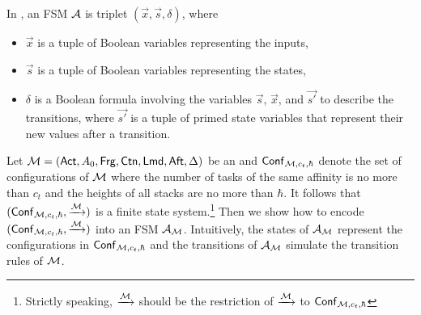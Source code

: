 In \nuxmv, an FSM  ${\mathcal{A} }$ is triplet
$(\vec{x}, \vec{s}, \delta)$, where 
\begin{itemize}
\item $\vec{x}$ is a tuple of Boolean variables representing the inputs, 
\item $\vec{s}$ is a tuple of Boolean variables representing the states,  
\item $\delta$ is a Boolean formula involving the variables $\vec{s}$, $\vec{x}$, and $\vec{s'}$ to describe the transitions, where $\vec{s'}$ is a tuple of primed state variables that represent their new values after a transition.
\end{itemize}
%


Let ${\mathcal{M} } = ({\sf Act}, A_0,{\sf Frg}, {\sf Ctn}, {\sf Lmd}, {\sf Aft},  \Delta)$ be an {\AMASS} and ${\mathsf{Conf} }_{{\mathcal{M} }, c_t, \hbar}$ denote the set of configurations of ${\mathcal{M} }$ where 
the number of tasks of the same affinity is no more than $c_t$ and 
the heights of all stacks are no more than $\hbar$. It follows that $({\mathsf{Conf} }_{{\mathcal{M} }, c_t, \hbar}, \xrightarrow{{\mathcal{M} }})$ is a finite state system.\footnote{Strictly speaking, $\xrightarrow{{\mathcal{M} }}$ should be the restriction of $\xrightarrow{{\mathcal{M} }}$  to ${\mathsf{Conf} }_{{\mathcal{M} }, c_t, \hbar}$}
Then we show how to encode $({\mathsf{Conf} }_{{\mathcal{M} }, c_t, \hbar}, \xrightarrow{{\mathcal{M} }})$ into an FSM ${\mathcal{A} }_{\mathcal{M} }$.
%
Intuitively, the states of ${\mathcal{A} }_{\mathcal{M} }$ represent the configurations in ${\mathsf{Conf} }_{{\mathcal{M} },c_t, \hbar}$ and the transitions of ${\mathcal{A} }_{\mathcal{M} }$ %
simulate the transition rules of ${\mathcal{M} }$. %
%

